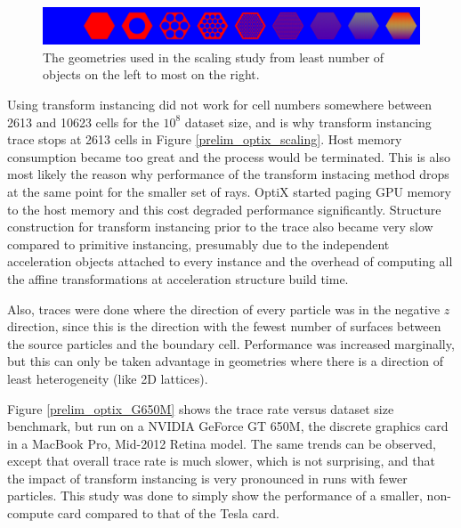 \begin{figure}[h!] 
  \centering
    \includegraphics[width=1.0\textwidth]{graphics/prelim/prelim_scaling_geom.png}
     \caption{The geometries used in the scaling study from least number of objects on the left to most on the right. \label{prelim_scaling_geom} }
\end{figure}

Using transform instancing did not work for cell numbers somewhere between 2613 and 10623 cells for the $10^8$ dataset size, and is why transform instancing trace stops at 2613 cells in Figure \ref{prelim_optix_scaling}.   Host memory consumption became too great and the process would be terminated.  This is also most likely the reason why performance of the transform instacing method drops at the same point for the smaller set of rays.  OptiX started paging GPU memory to the host memory and this cost degraded performance significantly.  Structure construction for transform instancing prior to the trace also became very slow compared to primitive instancing, presumably due to the independent acceleration objects attached to every instance and the overhead of computing all the affine transformations at acceleration structure build time.

Also, traces were done where the direction of every particle was in the negative $z$ direction, since this is the direction with the fewest number of surfaces between the source particles and the boundary cell.  Performance was increased marginally, but this can only be taken advantage in geometries where there is a direction of least heterogeneity (like 2D lattices).

Figure \ref{prelim_optix_G650M} shows the trace rate versus dataset size benchmark, but run on a NVIDIA GeForce GT 650M, the discrete graphics card in a MacBook Pro, Mid-2012 Retina model.  The same trends can be observed, except that overall trace rate is much slower, which is not surprising, and that the impact of transform instancing is very pronounced in runs with fewer particles.  This study was done to simply show the performance of a smaller, non-compute card compared to that of the Tesla card.

